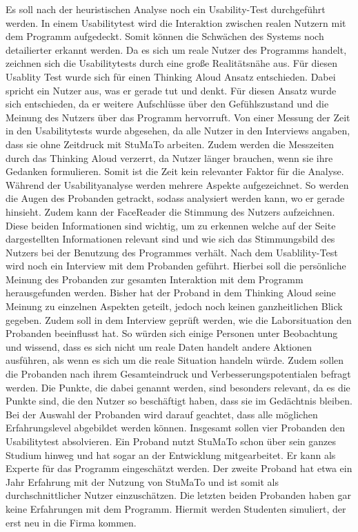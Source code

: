 \documentclass[
  12pt,
  ngerman,
  a4paper,
]{article}
\begin{document}
Es soll nach der heuristischen Analyse noch ein Usability-Test
durchgeführt werden. In einem Usabilitytest wird die Interaktion
zwischen realen Nutzern mit dem Programm aufgedeckt. Somit können die
Schwächen des Systems noch detailierter erkannt werden. Da es sich um
reale Nutzer des Programms handelt, zeichnen sich die Usabilitytests
durch eine große Realitätsnähe aus. Für diesen Usablity Test wurde sich
für einen Thinking Aloud Ansatz entschieden. Dabei spricht ein Nutzer
aus, was er gerade tut und denkt. Für diesen Ansatz wurde sich
entschieden, da er weitere Aufschlüsse über den Gefühlszustand und die
Meinung des Nutzers über das Programm hervorruft. Von einer Messung der
Zeit in den Usabilitytests wurde abgesehen, da alle Nutzer in den
Interviews angaben, dass sie ohne Zeitdruck mit StuMaTo arbeiten. Zudem
werden die Messzeiten durch das Thinking Aloud verzerrt, da Nutzer
länger brauchen, wenn sie ihre Gedanken formulieren. Somit ist die Zeit
kein relevanter Faktor für die Analyse. Während der Usabilityanalyse
werden mehrere Aspekte aufgezeichnet. So werden die Augen des Probanden
getrackt, sodass analysiert werden kann, wo er gerade hinsieht. Zudem
kann der FaceReader die Stimmung des Nutzers aufzeichnen. Diese beiden
Informationen sind wichtig, um zu erkennen welche auf der Seite
dargestellten Informationen relevant sind und wie sich das Stimmungsbild
des Nutzers bei der Benutzung des Programmes verhält. Nach dem
Usablility-Test wird noch ein Interview mit dem Probanden geführt.
Hierbei soll die persönliche Meinung des Probanden zur gesamten
Interaktion mit dem Programm herausgefunden werden. Bisher hat der
Proband in dem Thinking Aloud seine Meinung zu einzelnen Aspekten
geteilt, jedoch noch keinen ganzheitlichen Blick gegeben. Zudem soll in
dem Interview geprüft werden, wie die Laborsituation den Probanden
beeinflusst hat. So würden sich einige Personen unter Beobachtung und
wissend, dass es sich nicht um reale Daten handelt andere Aktionen
ausführen, als wenn es sich um die reale Situation handeln würde. Zudem
sollen die Probanden nach ihrem Gesamteindruck und
Verbesserungspotentialen befragt werden. Die Punkte, die dabei genannt
werden, sind besonders relevant, da es die Punkte sind, die den Nutzer
so beschäftigt haben, dass sie im Gedächtnis bleiben. Bei der Auswahl
der Probanden wird darauf geachtet, dass alle möglichen Erfahrungslevel
abgebildet werden können. Insgesamt sollen vier Probanden den
Usabilitytest absolvieren. Ein Proband nutzt StuMaTo schon über sein
ganzes Studium hinweg und hat sogar an der Entwicklung mitgearbeitet. Er
kann als Experte für das Programm eingeschätzt werden. Der zweite
Proband hat etwa ein Jahr Erfahrung mit der Nutzung von StuMaTo und ist
somit als durchschnittlicher Nutzer einzuschätzen. Die letzten beiden
Probanden haben gar keine Erfahrungen mit dem Programm. Hiermit werden
Studenten simuliert, der erst neu in die Firma kommen.
\end{document}
